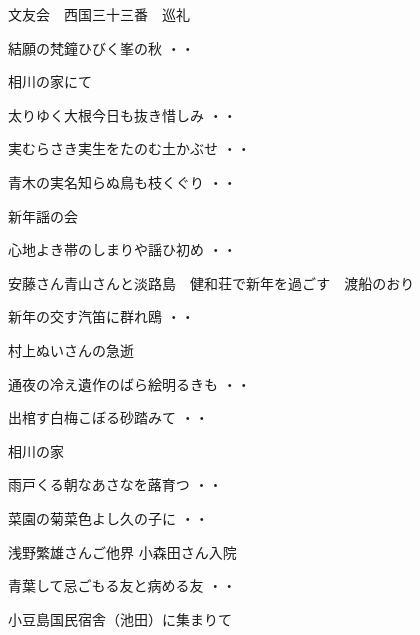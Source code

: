 文友会　西国三十三番　巡礼
\begin{shiika}結願の梵鐘ひびく峯の秋
\hfill{・・}\end{shiika}
\vspace{0.6cm}
相川の家にて
\begin{shiika}太りゆく大根今日も抜き惜しみ
\hfill{・・}\end{shiika}
\begin{shiika}実むらさき実生をたのむ土かぶせ
\hfill{・・}\end{shiika}
\begin{shiika}青木の実名知らぬ鳥も枝くぐり
\hfill{・・}\end{shiika}
\vspace{0.6cm}
新年謡の会
\begin{shiika}心地よき帯のしまりや謡ひ初め
\hfill{・・}\end{shiika}
\vspace{0.6cm}
安藤さん青山さんと淡路島　健和荘で新年を過ごす　渡船のおり
\begin{shiika}新年の交す汽笛に群れ鴎
\hfill{・・}\end{shiika}
\vspace{0.6cm}
村上ぬいさんの急逝
\begin{shiika}通夜の冷え遺作のばら絵明るきも
\hfill{・・}\end{shiika}
\begin{shiika}出棺す白梅こぼる砂踏みて
\hfill{・・}\end{shiika}
\vspace{0.6cm}
相川の家
\begin{shiika}雨戸くる朝なあさなを蕗育つ
\hfill{・・}\end{shiika}
\begin{shiika}菜園の菊菜色よし久の子に
\hfill{・・}\end{shiika}
\vspace{0.6cm}
浅野繁雄さんご他界 小森田さん入院
\begin{shiika}青葉して忌ごもる友と病める友
\hfill{・・}\end{shiika}
\vspace{0.6cm}
小豆島国民宿舎（池田）に集まりて
